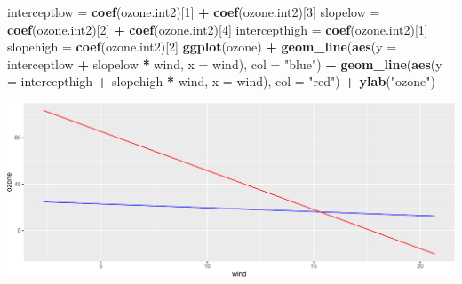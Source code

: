 \documentclass[
  ignorenonframetext,
]{beamer}
\newenvironment{Shaded}{\begin{snugshade}}{\end{snugshade}}
\newcommand{\AttributeTok}[1]{\textcolor[rgb]{0.13,0.29,0.53}{#1}}
\newcommand{\DecValTok}[1]{\textcolor[rgb]{0.00,0.00,0.81}{#1}}
\newcommand{\FunctionTok}[1]{\textcolor[rgb]{0.13,0.29,0.53}{\textbf{#1}}}
\newcommand{\NormalTok}[1]{#1}
\newcommand{\OtherTok}[1]{\textcolor[rgb]{0.56,0.35,0.01}{#1}}
\newcommand{\SpecialCharTok}[1]{\textcolor[rgb]{0.81,0.36,0.00}{\textbf{#1}}}
\newcommand{\StringTok}[1]{\textcolor[rgb]{0.31,0.60,0.02}{#1}}
\begin{document}
\begin{frame}[fragile]
\begin{Shaded}
\begin{Highlighting}[]
\NormalTok{interceptlow }\OtherTok{=} \FunctionTok{coef}\NormalTok{(ozone.int2)[}\DecValTok{1}\NormalTok{] }\SpecialCharTok{+} \FunctionTok{coef}\NormalTok{(ozone.int2)[}\DecValTok{3}\NormalTok{]}
\NormalTok{slopelow }\OtherTok{=} \FunctionTok{coef}\NormalTok{(ozone.int2)[}\DecValTok{2}\NormalTok{] }\SpecialCharTok{+} \FunctionTok{coef}\NormalTok{(ozone.int2)[}\DecValTok{4}\NormalTok{]}
\NormalTok{intercepthigh }\OtherTok{=} \FunctionTok{coef}\NormalTok{(ozone.int2)[}\DecValTok{1}\NormalTok{]}
\NormalTok{slopehigh }\OtherTok{=} \FunctionTok{coef}\NormalTok{(ozone.int2)[}\DecValTok{2}\NormalTok{]}
\FunctionTok{ggplot}\NormalTok{(ozone) }\SpecialCharTok{+} \FunctionTok{geom\_line}\NormalTok{(}\FunctionTok{aes}\NormalTok{(}\AttributeTok{y =}\NormalTok{ interceptlow }\SpecialCharTok{+}\NormalTok{ slopelow }\SpecialCharTok{*}\NormalTok{ wind, }\AttributeTok{x =}\NormalTok{ wind),}
    \AttributeTok{col =} \StringTok{"blue"}\NormalTok{) }\SpecialCharTok{+} \FunctionTok{geom\_line}\NormalTok{(}\FunctionTok{aes}\NormalTok{(}\AttributeTok{y =}\NormalTok{ intercepthigh }\SpecialCharTok{+}\NormalTok{ slopehigh }\SpecialCharTok{*}\NormalTok{ wind,}
    \AttributeTok{x =}\NormalTok{ wind), }\AttributeTok{col =} \StringTok{"red"}\NormalTok{) }\SpecialCharTok{+} \FunctionTok{ylab}\NormalTok{(}\StringTok{"ozone"}\NormalTok{)}
\end{Highlighting}
\end{Shaded}

\includegraphics{Module02MLRPresentationWeek1_files/figure-beamer/unnamed-chunk-16-1.pdf}
\end{frame}
\end{document}
